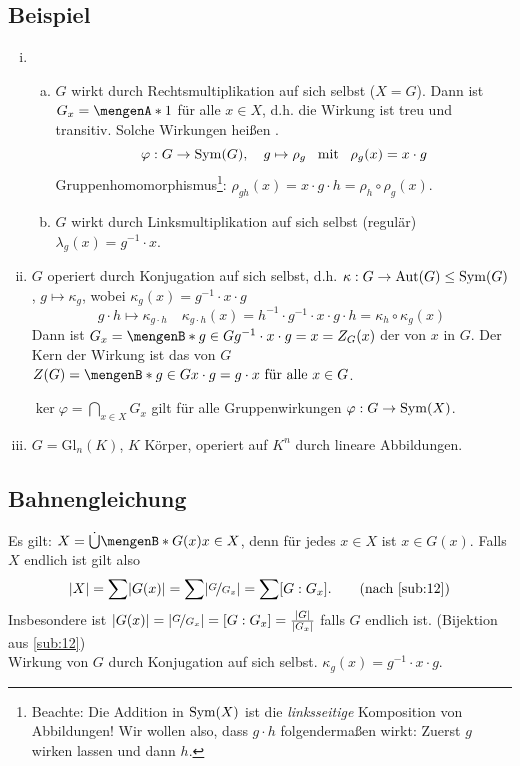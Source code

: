 \subsection[Beispiele für Gruppenwirkungen]{Beispiel} %
\label{sub:13}
\begin{enumerate}[(i)]
	\item\begin{enumerate}[(a)]
		\item $G$ wirkt durch Rechtsmultiplikation auf sich selbst ($X = G$). Dann ist $G_x = \set{1}$ für alle $x \in X$, d.h. die Wirkung ist treu und transitiv. Solche 
		Wirkungen heißen .
		\[
			\varphi : G \to \Sym(G) , \quad g \mapsto\rho_g \enspace \text{ mit } \enspace\rho_g(x) = x \cdot g
		\]
		Gruppenhomomorphismus\footnote{Beachte: Die Addition in $\Sym(X)$ ist die \emph{linksseitige} 
		Komposition von Abbildungen! Wir wollen also, dass $g \cdot h$ folgendermaßen wirkt: Zuerst $g$ wirken lassen und dann $h$.}: 
		$\rho_{g h} (x) = x \cdot g \cdot h = \rho_h \circ \rho_g (x)$.
		\item $G$ wirkt durch Linksmultiplikation auf sich selbst (regulär) $\lambda_g (x) = g ^{-1} \cdot x$.
	\end{enumerate}
	\item $G$ operiert durch Konjugation auf sich selbst, d.h. $\kappa : G  \to \Aut(G) \le \Sym(G)$, $g \mapsto \kappa_g$, wobei $\kappa_g(x) = g ^{-1} \cdot x \cdot  g$
	\[
		g \cdot  h \mapsto \kappa_{g \cdot h} \quad \kappa_{g \cdot h} (x) = h ^{-1} \cdot g ^{-1}\cdot x \cdot g \cdot h = \kappa_h \circ \kappa_g (x)
	\]
	Dann ist $G_x = \set[g \in G]{g ^{-1} \cdot x \cdot g = x} = Z_G(x) $ der  von $x$ in $G$. Der Kern der Wirkung ist das   von $G$ 
	$Z(G) = \set[g \in G]{x \cdot g = g \cdot x \text{ für alle } x \in G}$.
	
	 $\ker \varphi = \bigcap_{x \in X} G_x$ gilt für alle Gruppenwirkungen $\varphi : G \to \Sym(X)$.
	\item $G = \mathrm{Gl}_n(K)$, $K$ Körper, operiert auf $K^n$ durch lineare Abbildungen.
\end{enumerate}

\subsection{Bahnengleichung} %
\label{sub:14}
Es gilt: $X = \dot{\bigcup} \set[G(x)]{x \in X} $, denn für jedes $x\in X$ ist $x\in G(x)$. Falls $X$ endlich ist gilt also
\[
	\abs*{X} = \sum \abs*{G(x)} = \sum \abs*{\nicefrac{G}{G_x}} = \sum [G : G_x]. \tag{nach \ref{sub:12}}  
\]
Insbesondere ist $\abs*{G(x)} = \abs*{\nicefrac{G}{G_x}} = [G : G_x] = \frac{\abs*{G} }{\abs*{G_x} }  $ falls $G$ endlich ist. (Bijektion aus \ref{sub:12}) \\
 Wirkung von $G$ durch Konjugation auf sich selbst. $\kappa_g(x) = g ^{-1}  \cdot  x \cdot g$.

